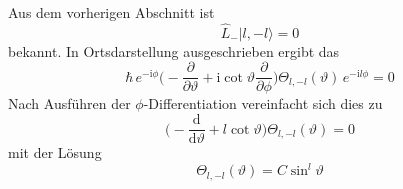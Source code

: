 \documentclass[9pt]{report}
\begin{document}
Aus dem vorherigen Abschnitt ist
\begin{equation}
\hat{L}_{-}|l,-l\rangle=0
\end{equation}
bekannt. In Ortsdarstellung ausgeschrieben ergibt das
\begin{equation}
\hbar\,e^{-\mathrm{i}\phi}\Big(-\frac{\partial}{\partial\vartheta}+\mathrm{i}\cot\vartheta\frac{\partial}{\partial\phi}\Big)\Theta_{l,-l}(\vartheta)\,e^{-\mathrm{i}l\phi}=0
\end{equation}
Nach Ausführen der $\phi$-Differentiation vereinfacht sich dies zu
\begin{equation}
\Big(-\frac{\mathrm{d}}{\mathrm{d}\vartheta}+l\cot\vartheta\Big)\Theta_{l,-l}(\vartheta)=0
\end{equation}
mit der Lösung
\begin{equation}
\Theta_{l,-l}(\vartheta)=C\sin^{l}\vartheta
\end{equation}
\end{document}
